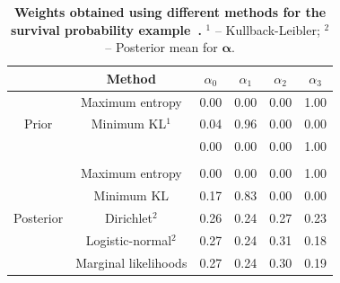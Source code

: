 \documentclass[12pt]{article}
\begin{document}
\begin{table}[ht]
\caption{\textbf{Weights obtained using different methods for the survival probability example~\parencite{Savchuk1994}.}
$^1$ -- Kullback-Leibler; $^2$ -- Posterior mean for $\boldsymbol\alpha$.}
\centering
\begin{tabular}{cccccc}
\hline
                           & Method                & $\alpha_0$   & $\alpha_1$   & $\alpha_2$   & $\alpha_3$\\
\hline
\multirow{3}{*}{Prior}     & Maximum entropy       & 0.00 & 0.00 & 0.00 & 1.00  \\
                           & Minimum KL$^1$        & 0.04 & 0.96 & 0.00 & 0.00 \\
                           & \textcite{Rufo2012A}      & 0.00 & 0.00 & 0.00 & 1.00  \\
                           &                       &      &      &      &      \\
\multirow{5}{*}{Posterior} & Maximum entropy       & 0.00 & 0.00 & 0.00 & 1.00  \\
                           & Minimum KL            & 0.17 & 0.83 & 0.00 & 0.00 \\
                           & Dirichlet$^2$        & 0.26 & 0.24 & 0.27 & 0.23 \\
                           & Logistic-normal$^2$ & 0.27 & 0.24 & 0.31 & 0.18 \\
                           & Marginal likelihoods  & 0.27 & 0.24 & 0.30 & 0.19\\
\hline                
\end{tabular}
\label{tab:alphasBeta}
\end{table}
\end{document}
